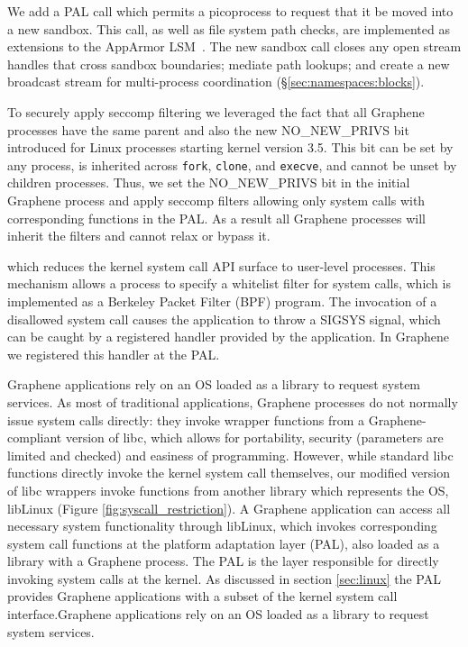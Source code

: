 \vspace{5pt}
 We add a PAL call which
permits a picoprocess to request that it be moved into a new sandbox.
This call, as well as file system path checks, are implemented
as extensions to the  AppArmor LSM~\citep{apparmor}.
The new sandbox call closes any open stream handles that cross sandbox boundaries;
mediate path lookups;
and create a new broadcast stream for multi-process
 coordination (\S\ref{sec:namespaces:blocks}).

To securely apply seccomp filtering we leveraged the fact that all
Graphene processes have the same parent and also the new
NO\_NEW\_PRIVS bit introduced for Linux processes starting kernel
version 3.5. This bit can be set by any process, is inherited across
{\tt fork}, {\tt clone}, and {\tt execve}, and cannot be unset by
children processes. Thus, we set the NO\_NEW\_PRIVS bit in the initial
Graphene process and apply seccomp filters allowing only system calls
with corresponding functions in the PAL. As a result all Graphene
processes will inherit the filters and cannot relax or bypass it.



which reduces the kernel
system call API surface to user-level processes. This mechanism allows
a process to specify a whitelist filter for system calls, which is
implemented as a Berkeley Packet Filter (BPF) program. The invocation
of a disallowed system call causes the application to throw a SIGSYS
signal, which can be caught by a registered handler provided by the
application. In Graphene we registered this handler at the PAL.


Graphene applications rely on an OS loaded as a library to request
system services. As most of traditional applications, Graphene
processes do not normally issue system calls directly: they invoke
wrapper functions from a Graphene-compliant version of libc, which
allows for portability, security (parameters are limited and checked)
and easiness of programming. However, while standard libc functions
directly invoke the kernel system call themselves, our modified
version of libc wrappers invoke functions from another library which
represents the OS, libLinux (Figure \ref{fig:syscall_restriction}). A
Graphene application can access all necessary system functionality
through libLinux, which invokes corresponding system call functions at
the platform adaptation layer (PAL), also loaded as a library with a
Graphene process. The PAL is the layer responsible for directly
invoking system calls at the kernel. As discussed in section
\ref{sec:linux} the PAL provides Graphene applications with a
subset of the kernel system call interface.Graphene applications rely
on an OS loaded as a library to request system services.

